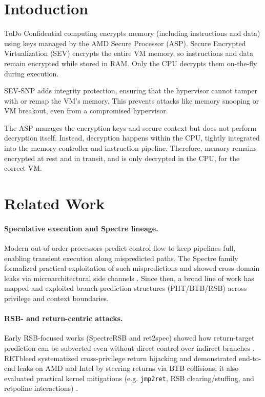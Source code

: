 \documentclass[11pt,a4paper]{article}
\begin{document}
\section{Intoduction}
ToDo
Confidential computing encrypts memory (including instructions and data) using keys managed by the AMD Secure Processor (ASP). Secure Encrypted Virtualization (SEV) encrypts the entire VM memory, so instructions and data remain encrypted while stored in RAM. Only the CPU decrypts them on-the-fly during execution.

SEV-SNP adds integrity protection, ensuring that the hypervisor cannot tamper with or remap the VM's memory. This prevents attacks like memory snooping or VM breakout, even from a compromised hypervisor.

The ASP manages the encryption keys and secure context but does not perform decryption itself. Instead, decryption happens within the CPU, tightly integrated into the memory controller and instruction pipeline. Therefore, memory remains encrypted at rest and in transit, and is only decrypted in the CPU, for the correct VM.
\clearpage

\section{Related Work}
\label{sec:related}

\paragraph{Speculative execution and Spectre lineage.} Modern out-of-order processors predict control flow to keep pipelines full, enabling transient execution along mispredicted paths. The Spectre family formalized practical exploitation of such mispredictions and showed cross-domain leaks via microarchitectural side channels \cite{kocher2018spectre}. Since then, a broad line of work has mapped and exploited branch-prediction structures (PHT/BTB/RSB) across privilege and context boundaries.

\paragraph{RSB- and return-centric attacks.}
Early RSB-focused works (SpectreRSB and ret2spec) showed how return-target prediction can be subverted even without direct control over indirect branches \cite{koruyeh2018spectrersb,maisuradze2018ret2spec}. RETbleed systematized cross-privilege return hijacking and demonstrated end-to-end leaks on AMD and Intel by steering returns via BTB collisions; it also evaluated practical kernel mitigations (e.g. \texttt{jmp2ret}, RSB clearing/stuffing, and retpoline interactions) \cite{wikner2022retbleed}.
\end{document}
